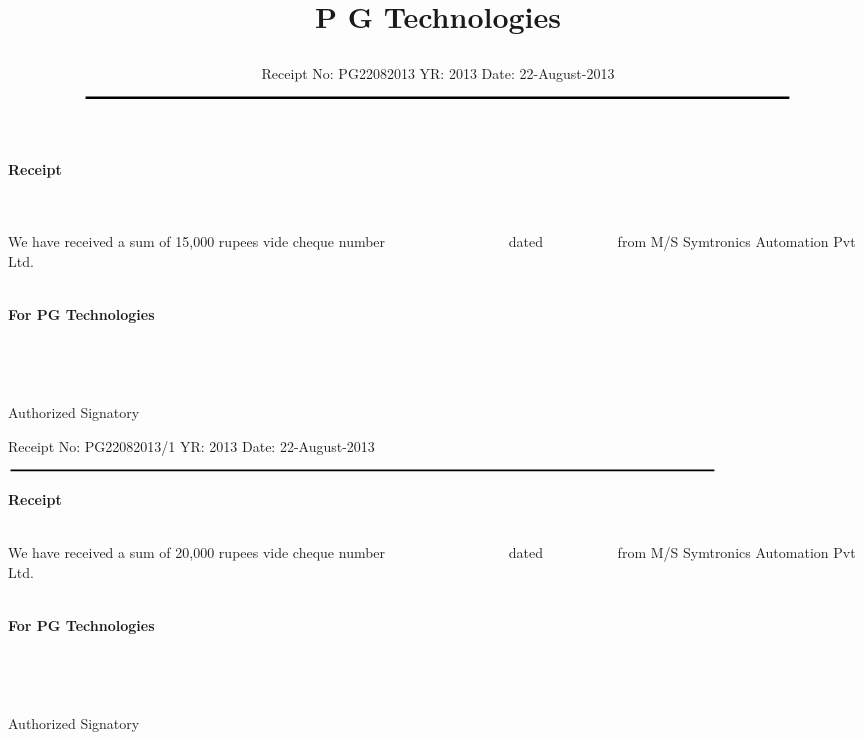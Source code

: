 \documentclass[11pt]{article}
\title{\vspace*{-1.5cm} \centerline{ {\Huge{ \bf \hspace{0cm} P G Technologies}\vspace*{-0.75cm}}}}
\author{
 \scriptsize Receipt No: PG22082013  \hspace*{4cm}   YR: 2013 \hspace*{4cm} Date: 22-August-2013\\
$\rule{7.0in}{0.5mm}$}
\date{}
\begin{document}
\maketitle
\thispagestyle{empty}
\vspace*{-0.5cm}	
\large{
\centerline{ \Huge \bf  Receipt}  
\  \\ \\

We have received a sum of 15,000 rupees vide cheque number  \  \  \  \  \  \  \  \  \  \   \  \   \   \   \   \  \ dated  \   \   \  \  \  \  \  \   \  \   from  M/S Symtronics Automation Pvt Ltd.  \\  \\

} 
{\bf For  PG Technologies } \\ \\ \\ \\ \\
 \hspace*{0.6cm}Authorized Signatory


\vspace*{20pt}

\hspace*{-3cm}\hdashrule[0.5ex]{25cm}{1pt}{3mm}
\vspace*{20pt}




{
}

{{\scriptsize Receipt No: PG22082013/1  \hspace*{4cm}   YR: 2013 \hspace*{4cm} Date: 22-August-2013\\
$\rule{7.0in}{0.5mm}$}\\

\centerline{ \vspace*{30pt}\Huge \bf  Receipt}  
\  \\ 

We have received a sum of 20,000 rupees vide cheque number  \  \  \  \  \  \  \  \  \  \   \  \   \   \   \   \  \ dated  \   \   \  \  \  \  \  \   \  \   from  M/S Symtronics Automation Pvt Ltd.  \\  \\

} 
{\bf For  PG Technologies } \\ \\ \\ \\ \\
 \hspace*{0.6cm}Authorized Signatory
\vspace*{-72pt}
\end{document}
